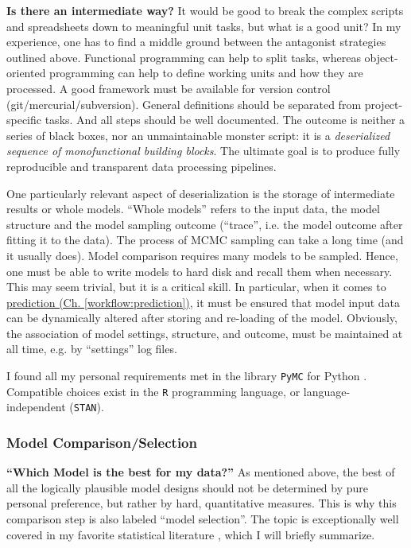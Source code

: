 \textbf{Is there an intermediate way?}
It would be good to break the complex scripts and spreadsheets down to meaningful unit tasks, but what is a good unit?
In my experience, one has to find a middle ground between the antagonist strategies outlined above.
Functional programming can help to split tasks, whereas object-oriented programming can help to define working units and how they are processed.
A good framework must be available for version control (git/mercurial/subversion).
General definitions should be separated from project-specific tasks.
And all steps should be well documented.
The outcome is neither a series of black boxes, nor an unmaintainable monster script: it is a \emph{deserialized sequence of monofunctional building blocks}.
The ultimate goal is to produce fully reproducible and transparent data processing pipelines.


One particularly relevant aspect of deserialization is the storage of intermediate results or whole models.
``Whole models'' refers to the input data, the model structure and the model sampling outcome (``trace'', i.e. the model outcome after fitting it to the data).
The process of MCMC sampling can take a long time (and it usually does).
Model comparison requires many models to be sampled.
Hence, one must be able to write models to hard disk and recall them when necessary.
This may seem trivial, but it is a critical skill.
In particular, when it comes to \hyperref[workflow:prediction]{prediction (Ch. \ref{workflow:prediction})}, it must be ensured that model input data can be dynamically altered after storing and re-loading of the model.
Obviously, the association of model settings, structure, and outcome, must be maintained at all time, e.g. by ``settings'' log files.


I found all my personal requirements met in the library \texttt{PyMC} for Python \citep{Salvatier2016}.
Compatible choices exist in the \texttt{R} programming language, or language-independent (\texttt{STAN}).


\subsubsection{Model Comparison/Selection}
\label{workflow:comparison}
\textbf{``Which Model is the best for my data?''}
As mentioned above, the best of all the logically plausible model designs should not be determined by pure personal preference, but rather by hard, quantitative measures.
This is why this comparison step is also labeled ``model selection''.
The topic is exceptionally well covered in my favorite statistical literature \citep[][Ch. 11 therein]{McElreath2018}, which I will briefly summarize.

